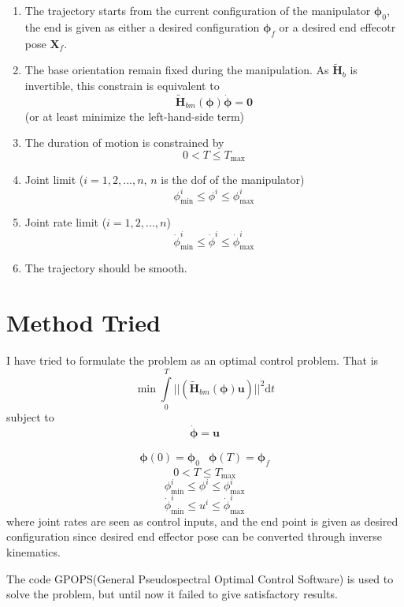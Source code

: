 \documentclass{article}
\begin{document}
\begin{enumerate}
	\item The trajectory starts from the current configuration of the manipulator $\bm{\phi}_0$, the end is given as either a desired configuration $\bm{\phi}_f$ or a desired end effecotr pose $\bm{X}_f$.
	\item The base orientation remain fixed during the manipulation. As $\tilde{\bm{H}}_b$ is invertible, this constrain is equivalent to 
	\begin{equation}
		\tilde{\bm{H}}_{bm}(\bm{\phi})\dot{\bm{\phi}} = \bm{0}
	\end{equation}
	(or at least minimize the left-hand-side term)
	\item The duration of motion is constrained by 
	\begin{equation}
		0 < T \le T_{\mathrm{max}}
	\end{equation}
	\item Joint limit ($i = 1,2,...,n$, $n$ is the dof of the manipulator)
	\begin{equation}
		\phi^i_{\mathrm{min}} \le \phi^i \le \phi^i_{\mathrm{max}}
	\end{equation}
	\item Joint rate limit ($i = 1,2,...,n$)
		\begin{equation}
		\dot{\phi}^i_{\mathrm{min}} \le \dot{\phi}^i \le \dot{\phi}^i_{\mathrm{max}}
		\end{equation}
	\item The trajectory should be smooth.
\end{enumerate}

\section{Method Tried}
I have tried to formulate the problem as an optimal control problem. That is 
	\begin{equation}
	\label{e:min}
		\min\int\limits_0^T||(\tilde{\bm{H}}_{bm}(\bm{\phi})\bm{u})||^2\mathrm{d}t
	\end{equation}
	subject to
	\begin{equation}
		\dot{\bm{\phi}} = \bm{u}
	\end{equation}
	
	\begin{equation}
	\begin{array}{rl}
		\bm{\phi}(0) = \bm{\phi}_0 & \bm{\phi}(T) = \bm{\phi}_f
	\end{array}	
	\end{equation}
	\begin{equation}
		0 < T \le T_{\mathrm{max}}
	\end{equation}
	\begin{equation}
		\phi^i_{\mathrm{min}} \le \phi^i \le \phi^i_{\mathrm{max}}
	\end{equation}
	\begin{equation}
		\dot{\phi}^i_{\mathrm{min}} \le {u}^i \le \dot{\phi}^i_{\mathrm{max}}
	\end{equation}
where joint rates are seen as control inputs, and the end point is given as desired configuration since desired end effector pose can be converted through inverse kinematics.

The code GPOPS(General Pseudospectral Optimal Control Software) is used to solve the problem, but until now it failed to give satisfactory results.



\end{document}
